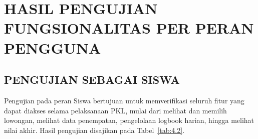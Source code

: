 
\section{HASIL PENGUJIAN FUNGSIONALITAS PER PERAN PENGGUNA}

\subsection{PENGUJIAN SEBAGAI SISWA}

Pengujian pada peran Siswa bertujuan untuk memverifikasi seluruh fitur yang dapat diakses selama pelaksanaan PKL, mulai dari melihat dan memilih lowongan, melihat data penempatan, pengelolaan logbook harian, hingga melihat nilai akhir. Hasil pengujian disajikan pada Tabel~\ref{tab:4.2}.

